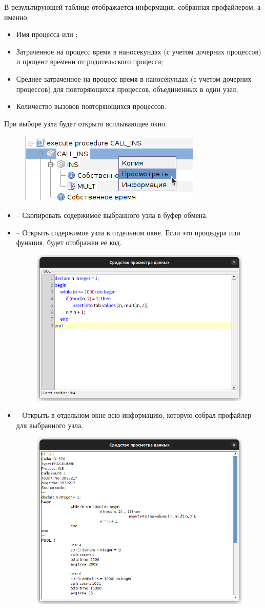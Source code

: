В результирующей таблице отображается информация, собранная профайлером, а именно:
\begin{itemize}
	\item Имя процесса или ;
	\item Затраченное на процесс время в наносекундах (с учетом дочерних процессов) и процент времени от родительского процесса;
	\item Среднее затраченное на процесс время в наносекундах (с учетом дочерних процессов) для повторяющихся процессов, объединенных в один узел; 
	\item Количество вызовов повторяющихся процессов.
\end{itemize}
При выборе узла будет открыто всплывающее окно.
\begin{figure}[H]
	\centering
	\includegraphics[width = 0.4\linewidth]{img/profiler_nodes.png}
\end{figure}
\begin{itemize}
	\item {} -- Скопировать содержимое выбранного узла в буфер обмена.
	\item {} -- Открыть содержимое узла в отдельном окне. Если это процедура или функция, будет отображен ее код.
	\begin{figure}[H]
		\centering
		\includegraphics[width = 0.5\linewidth]{img/profiler_node_view.png}
	\end{figure}
	\item {} -- Открыть в отдельном окне всю информацию, которую собрал профайлер для выбранного узла.
	\begin{figure}[H]
		\centering
		\includegraphics[width = 0.6\linewidth]{img/profiler_node_info.png}
	\end{figure}
\end{itemize}
